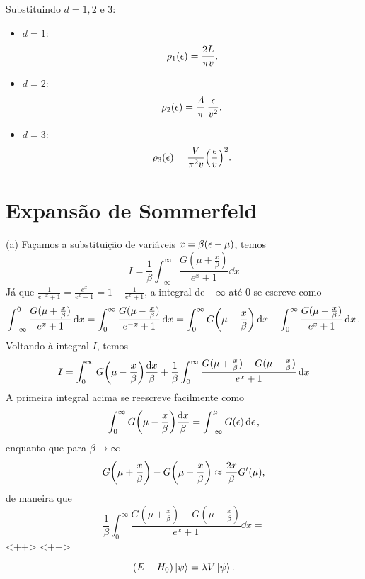 \documentclass[a4paper,10pt]{article}
\begin{document}
Substituindo $d = 1, 2$ e $3$:
\begin{itemize}
\item $d = 1$:
$$
\rho_1(\epsilon) = \frac{2 L}{\pi v}.
$$
\item $d = 2$:
$$
\rho_2(\epsilon) = \frac{A}{\pi} \, \frac{\epsilon}{v^2}.
$$
\item $d = 3$:
$$
\rho_3(\epsilon) = \frac{V}{\pi^2 v} \qty(\frac{\epsilon}{v})^2.
$$
\end{itemize}



\pagebreak

\section{Expansão de Sommerfeld}

(a) Façamos a substituição de variáveis $x = \beta(\epsilon - \mu)$, temos
$$
I = \frac{1}{\beta} \int_{-\infty}^{\infty} \frac{G(\mu + \frac{x}{\beta})}{e^{x} + 1} \dd{x}
$$
Já que $\displaystyle{\frac{1}{e^{-x} + 1} = \frac{e^x}{e^x + 1} = 1 - \frac{1}{e^x + 1}}$, a integral de $-\infty$ até $0$ se escreve como
$$
\int_{-\infty}^0 \frac{G(\mu + \frac{x}{\beta})}{e^{x} + 1} \dd{x} =
\int_0^{\infty} \frac{G(\mu - \frac{x}{\beta})}{e^{-x} + 1} \dd{x} =
\int_0^{\infty} G\qty(\mu - \frac{x}{\beta}) \dd{x} -
\int_0^{\infty} \frac{G(\mu - \frac{x}{\beta})}{e^{x} + 1} \dd{x}.
$$
Voltando à integral $I$, temos
$$
I =
\int_0^{\infty} G\qty(\mu - \frac{x}{\beta}) \frac{\dd{x}}{\beta} +
\frac{1}{\beta}
\int_0^{\infty}\frac{G(\mu + \frac{x}{\beta}) - G(\mu - \frac{x}{\beta})}{e^x + 1}\dd{x}
$$
A primeira integral acima se reescreve facilmente como
$$
\int_0^\infty G\qty(\mu - \frac{x}{\beta}) \frac{\dd{x}}{\beta} =
\int_{-\infty}^\mu G(\epsilon) \dd{\epsilon},
$$
enquanto que para $\beta \to \infty$
$$
G\qty(\mu + \frac{x}{\beta}) - G\qty(\mu - \frac{x}{\beta}) \approx \frac{2x}{\beta} G'(\mu),
$$
de maneira que
$$
\frac{1}{\beta}
\int_0^{\infty}\frac{G(\mu + \frac{x}{\beta}) - G(\mu - \frac{x}{\beta})}{e^x + 1}\dd{x}=
$$
<++>
<++>

\begin{equation} \label{eq:pertub}
(E - H_0) \ket{\psi} = \lambda V \ket{\psi}.
\end{equation}
\end{document}
